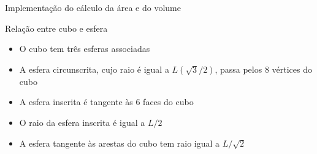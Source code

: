 \begin{frame}[fragile]{Implementação do cálculo da área e do volume}
\end{frame}

\begin{frame}[fragile]{Relação entre cubo e esfera}

    \begin{itemize}
        \item O cubo tem três esferas associadas

        \item A esfera circunscrita, cujo raio é igual a $L(\sqrt{3}/2)$, passa pelos 8 vértices do 
            cubo

        \item A esfera inscrita é tangente às 6 faces do cubo

        \item O raio da esfera inscrita é igual a $L/2$

        \item A esfera tangente às arestas do cubo tem raio igual a $L/\sqrt{2}$

    \end{itemize}

\end{frame}
